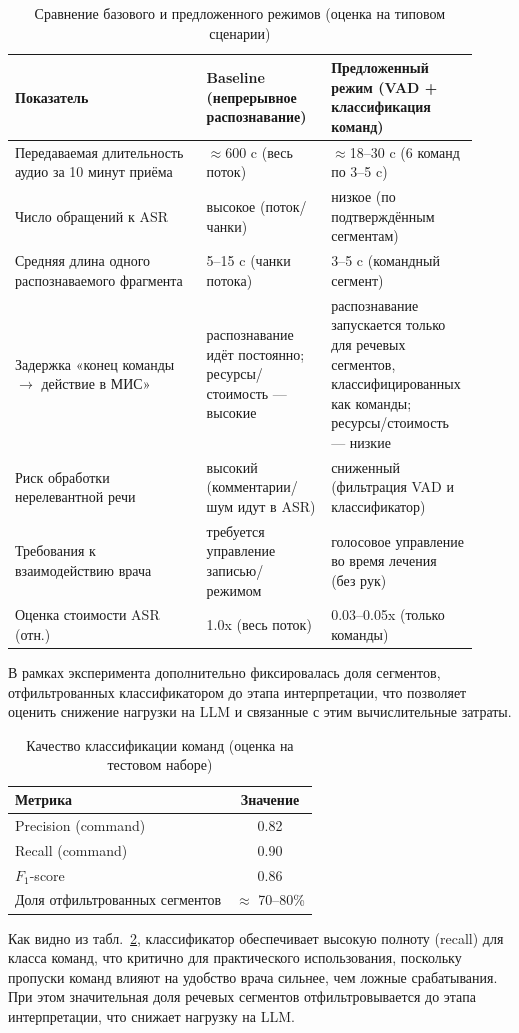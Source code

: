 \begin{table}[t]
    \centering
    \caption{Сравнение базового и предложенного режимов (оценка на типовом сценарии)}
    \label{tab:exp_results}
    \begin{tabular}{|p{0.40\linewidth}|p{0.26\linewidth}|p{0.26\linewidth}|}
    \hline
    \textbf{Показатель} & \textbf{Baseline (непрерывное распознавание)} & \textbf{Предложенный режим (VAD + классификация команд)} \\
    \hline
    Передаваемая длительность аудио за 10 минут приёма & $\approx$600 c (весь поток) & $\approx$18--30 c (6 команд по 3--5 c) \\
    \hline
    Число обращений к ASR & высокое (поток/чанки) & низкое (по подтверждённым сегментам) \\
    \hline
    Средняя длина одного распознаваемого фрагмента & 5--15 c (чанки потока) & 3--5 c (командный сегмент) \\
    \hline
    Задержка «конец команды $\rightarrow$ действие в МИС» & распознавание идёт постоянно; ресурсы/стоимость — высокие & распознавание запускается только для речевых сегментов, классифицированных как команды; ресурсы/стоимость — низкие \\
    \hline
    Риск обработки нерелевантной речи & высокий (комментарии/шум идут в ASR) & сниженный (фильтрация VAD и классификатор) \\
    \hline
    Требования к взаимодействию врача & требуется управление записью/режимом & голосовое управление во время лечения (без рук) \\
    \hline
    Оценка стоимости ASR (отн.) & 1.0x (весь поток) & 0.03--0.05x (только команды) \\
    \hline
    \end{tabular}
\end{table}
В рамках эксперимента дополнительно фиксировалась доля сегментов, отфильтрованных классификатором до этапа интерпретации, что позволяет оценить снижение нагрузки на LLM и связанные с этим вычислительные затраты.

\begin{table}[t]
    \centering
    \caption{Качество классификации команд (оценка на тестовом наборе)}
    \label{tab:clf_metrics}
    \begin{tabular}{|l|c|}
    \hline
    \textbf{Метрика} & \textbf{Значение} \\
    \hline
    Precision (command) & 0.82 \\
    Recall (command) & 0.90 \\
    $F_1$-score & 0.86 \\
    \hline
    Доля отфильтрованных сегментов & $\approx$ 70--80\% \\
    \hline
    \end{tabular}
\end{table}
Как видно из табл.~\ref{tab:clf_metrics}, классификатор обеспечивает высокую полноту (recall) для класса команд, что критично для практического использования, поскольку пропуски команд влияют на удобство врача сильнее, чем ложные срабатывания.
При этом значительная доля речевых сегментов отфильтровывается до этапа интерпретации, что снижает нагрузку на LLM.


